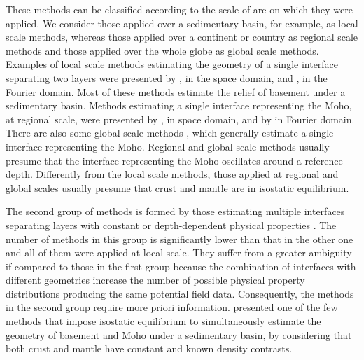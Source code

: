 \documentclass[manuscript]{geophysics}
\begin{document}
These methods can be classified according to the scale of are on which
they were applied.
We consider those applied over a sedimentary basin, for example, as local scale methods,
whereas those applied over a continent or country as regional scale methods
and those applied over the whole globe as global scale methods.
Examples of local scale methods estimating the geometry of a single
interface separating two layers were presented by
\citet{bott1960, tanner1967, cordell-henderson1968, dyrelius-vogel1972, pedersen1977,
pilkington-crossley1986, richardson-macinnes1989, barbosa-etal1997, 
barbosa-etal1999, barbosa-etal1999b, silva-etal2006, pilkington2006, 
chakravarthi-sundararajan2007, martins-etal2010, silva-etal2010, lima-etal2011, 
martins-etal2011, barnes-barraud2012, silva-etal2014, silva-santos2017},
in the space domain, and 
\citet{oldenburg1974, granser1987, reamer-ferguson1989, guspi1993},
in the Fourier domain.
Most of these methods estimate the relief of basement under a sedimentary basin.
Methods estimating a single interface representing the Moho, at regional
scale, were presented by 
\citet{shin-etal2009, bagherbandi-eshagh2012, barzaghi-biagi2014, sampietro2015, uieda-barbosa2017},
in space domain, and by 
\citet{braitenberg-etal1997, braitenberg-zadro1999, vandermeijde-etal2013}
in Fourier domain.
There are also some global scale methods 
\citep[e.g.,][]{sunkel1985, sjoberg2009},
which generally estimate a single interface representing the Moho.
Regional and global scale methods usually presume that the interface representing
the Moho oscillates around a reference depth.
Differently from the local scale methods, those applied at regional and global scales
usually presume that crust and mantle are in isostatic equilibrium.

The second group of methods is formed by those estimating multiple interfaces
separating layers with constant or depth-dependent physical properties
\citep[e.g.,][]{pilkington-crossley1986b, gallardo-etal2005, camacho-etal2011, salem-etal2014}.
The number of methods in this group is significantly lower than that
in the other one and all of them were applied at local scale.
They suffer from a greater ambiguity if compared to those in the first group
because the combination of interfaces with different geometries
increase the number of possible physical property distributions producing
the same potential field data.
Consequently, the methods in the second group require more priori information.
\citet{salem-etal2014} presented one of the few methods that impose isostatic
equilibrium to simultaneously estimate the geometry of basement and Moho 
under a sedimentary basin, by considering that both crust and mantle have 
constant and known density contrasts.
\end{document}

